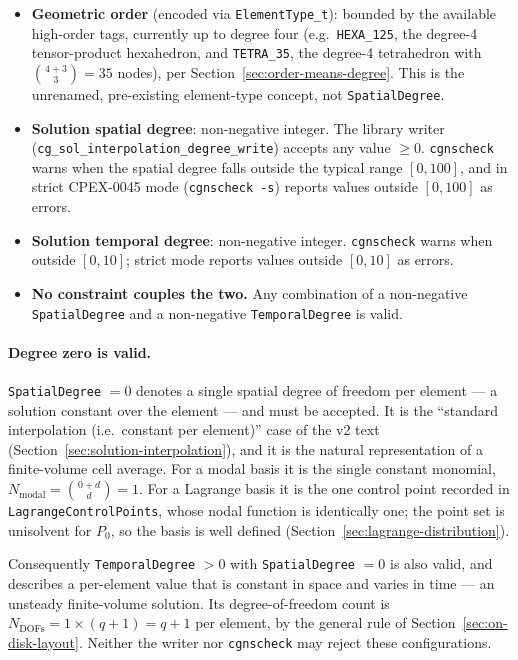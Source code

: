 \documentclass[11pt,letterpaper]{article}
\begin{document}
\begin{itemize}
  \item \textbf{Geometric order} (encoded via \texttt{ElementType\_t}): bounded by the available
    high-order tags, currently up to degree four (e.g.\ \texttt{HEXA\_125}, the degree-4
    tensor-product hexahedron, and \texttt{TETRA\_35}, the degree-4 tetrahedron with
    $\binom{4+3}{3} = 35$ nodes), per Section~\ref{sec:order-means-degree}.  This is the
    unrenamed, pre-existing element-type concept, not \texttt{SpatialDegree}.
  \item \textbf{Solution spatial degree}: non-negative integer.  The library writer
    (\texttt{cg\_sol\_interpolation\_degree\_write}) accepts any value $\ge 0$.
    \texttt{cgnscheck} warns when the spatial degree falls outside the typical range
    $[0,100]$, and in strict CPEX-0045 mode (\texttt{cgnscheck -s}) reports values outside
    $[0,100]$ as errors.
  \item \textbf{Solution temporal degree}: non-negative integer.  \texttt{cgnscheck}
    warns when outside $[0,10]$; strict mode reports values outside $[0,10]$ as errors.
  \item \textbf{No constraint couples the two.}  Any combination of a non-negative
    \texttt{SpatialDegree} and a non-negative \texttt{TemporalDegree} is valid.
\end{itemize}

\paragraph{Degree zero is valid.}
\texttt{SpatialDegree} $= 0$ denotes a single spatial degree of freedom per element --- a
solution constant over the element --- and must be accepted.  It is the ``standard
interpolation (i.e.\ constant per element)'' case of the v2 text
(Section~\ref{sec:solution-interpolation}), and it is the natural representation of a
finite-volume cell average.  For a modal basis it is the single constant monomial,
$N_\mathrm{modal} = \binom{0+d}{d} = 1$.  For a Lagrange basis it is the one control point
recorded in \texttt{LagrangeControlPoints}, whose nodal function is identically one; the point
set is unisolvent for $P_0$, so the basis is well defined
(Section~\ref{sec:lagrange-distribution}).

Consequently \texttt{TemporalDegree} $> 0$ with \texttt{SpatialDegree} $= 0$ is also valid, and
describes a per-element value that is constant in space and varies in time --- an unsteady
finite-volume solution.  Its degree-of-freedom count is
$N_\mathrm{DOFs} = 1 \times (q+1) = q+1$ per element, by the general rule of
Section~\ref{sec:on-disk-layout}.  Neither the writer nor \texttt{cgnscheck} may reject these
configurations.
\end{document}
